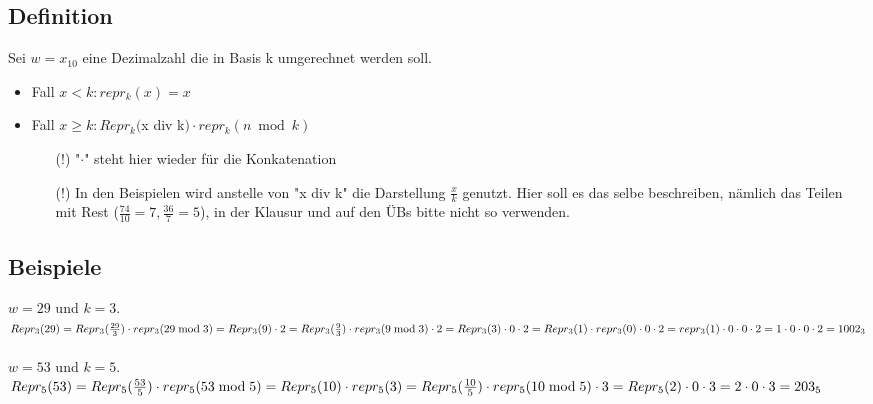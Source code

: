 \documentclass[11pt]{article} %
\begin{document}
\subsection{Definition} %
Sei $w = x_{10}$ eine Dezimalzahl die in Basis k umgerechnet werden soll.
\begin{itemize}
	\item Fall $x < k: repr_k(x) = x$
	\item Fall $x \geq k: Repr_k($x div k$) \cdot repr_k(n \bmod k)$
	\begin{itemize}
		\item[(!)] "$\cdot$" steht hier wieder für die Konkatenation
		\item[(!)] In den Beispielen wird anstelle von "x div k" die Darstellung $\frac{x}{k}$ genutzt. Hier soll es das selbe beschreiben, nämlich das Teilen mit Rest ($\frac{74}{10} = 7, \frac{36}{7} = 5$), in der Klausur und auf den ÜBs bitte nicht so verwenden.
	\end{itemize}
\end{itemize}


\subsection{Beispiele} %
$w = 29$ und $k = 3$.\\
$ Repr_3(29) \\
= Repr_3(\frac{29}{3}) \cdot repr_3(29 \bmod 3) \\
= Repr_3(9) \cdot 2 \\
= Repr_3(\frac{9}{3}) \cdot repr_3(9 \bmod 3) \cdot 2 \\
= Repr_3(3)\cdot 0 \cdot 2 \\
= Repr_3(1) \cdot repr_3(0) \cdot 0 \cdot 2 \\
= repr_3(1) \cdot 0 \cdot 0 \cdot 2 \\
= 1 \cdot 0 \cdot 0 \cdot 2 = 1002_3\\$
\ \\
$w = 53$ und $k = 5$.\\
$ Repr_5(53) \\
= Repr_5(\frac{53}{5}) \cdot repr_5(53 \bmod 5) \\
= Repr_5(10) \cdot repr_5(3)\\
= Repr_5(\frac{10}{5}) \cdot repr_5(10 \bmod 5) \cdot 3\\
= Repr_5(2) \cdot 0 \cdot 3 \\
= 2 \cdot 0 \cdot 3 = 203_5$
\end{document}

